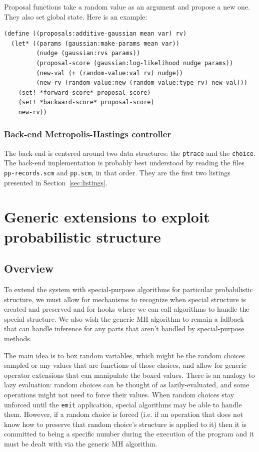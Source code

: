 \documentclass{article}
\begin{document}
Proposal functions take a random value as an argument and propose a new one.
They also set global state. Here is an example:

\begin{listing}[H]
\begin{verbatim}
(define ((proposals:additive-gaussian mean var) rv)
  (let* ((params (gaussian:make-params mean var))
         (nudge (gaussian:rvs params))
         (proposal-score (gaussian:log-likelihood nudge params))
         (new-val (+ (random-value:val rv) nudge))
         (new-rv (random-value:new (random-value:type rv) new-val)))
    (set! *forward-score* proposal-score)
    (set! *backward-score* proposal-score)
    new-rv))
\end{verbatim}
\end{listing}

\subsubsection{Back-end Metropolis-Hastings controller}

The back-end is centered around two data structures: the \texttt{ptrace} and
the \texttt{choice}. The back-end implementation is probably best understood by
reading the files \texttt{pp-records.scm} and \texttt{pp.scm}, in that order.
They are the first two listings presented in Section~\ref{sec:listings}.

\section{Generic extensions to exploit probabilistic structure}
\label{sec:foo}
\subsection{Overview}

To extend the system with special-purpose algorithms for particular
probabilistic structure, we must allow for mechanisms to recognize when special
structure is created and preserved and for hooks where we can call algorithms
to handle the special structure. We also wish the generic MH algorithm to
remain a fallback that can handle inference for any parts that aren't handled
by special-purpose methods.

The main idea is to box random variables, which might be the random choices
sampled or any values that are functions of those choices, and allow for
generic operator extensions that can manipulate the boxed values. There is an
analogy to lazy evaluation: random choices can be thought of as
lazily-evaluated, and some operations might not need to force their values.
When random choices stay unforced until the \texttt{emit} application, special
algorithms may be able to handle them. However, if a random choice is forced
(i.e. if an operation that does not know how to preserve that random choice's
structure is applied to it) then it is committed to being a specific number
during the execution of the program and it must be dealt with via the generic
MH algorithm.
\end{document}
